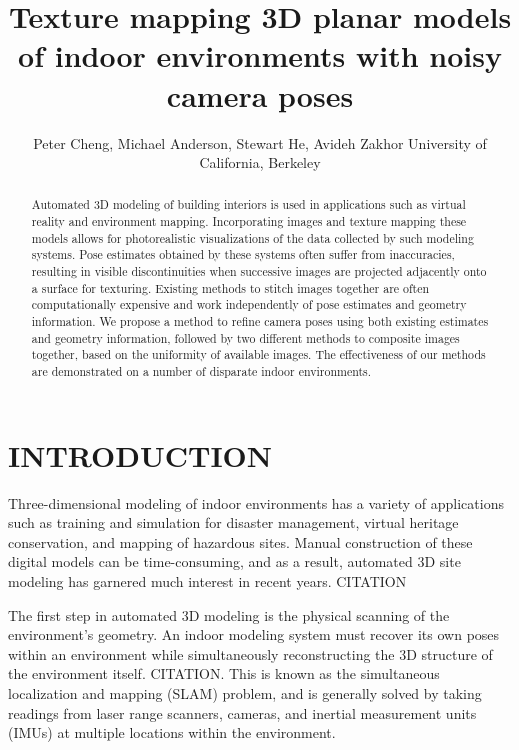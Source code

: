 \documentclass[]{spie}  %
\title{Texture mapping 3D planar models of indoor environments with noisy camera poses}
\author{Peter Cheng, Michael Anderson, Stewart He, Avideh Zakhor
\skiplinehalf
University of California, Berkeley\\
}
\begin{document}
\maketitle

\begin{abstract}
  Automated 3D modeling of building interiors is used in applications
  such as virtual reality and environment mapping. Incorporating
  images and texture mapping these models allows for photorealistic
  visualizations of the data collected by such modeling systems. Pose
  estimates obtained by these systems often suffer from inaccuracies,
  resulting in visible discontinuities when successive images are
  projected adjacently onto a surface for texturing. Existing methods
  to stitch images together are often computationally expensive and
  work independently of pose estimates and geometry information. We
  propose a method to refine camera poses using both existing
  estimates and geometry information, followed by two different
  methods to composite images together, based on the uniformity of
  available images. The effectiveness of our methods are demonstrated
  on a number of disparate indoor environments.
\end{abstract}



\section{INTRODUCTION}
\label{sec:introduction} %
Three-dimensional modeling of indoor environments has a variety of
applications such as training and simulation for disaster management,
virtual heritage conservation, and mapping of hazardous sites. Manual
construction of these digital models can be time-consuming, and as a
result, automated 3D site modeling has garnered much interest in
recent years. CITATION

The first step in automated 3D modeling is the physical scanning of
the environment's geometry. An indoor modeling system must recover its
own poses within an environment while simultaneously reconstructing
the 3D structure of the environment itself. CITATION. This is known as
the simultaneous localization and mapping (SLAM) problem, and is
generally solved by taking readings from laser range scanners,
cameras, and inertial measurement units (IMUs) at multiple locations
within the environment.
\end{document}
